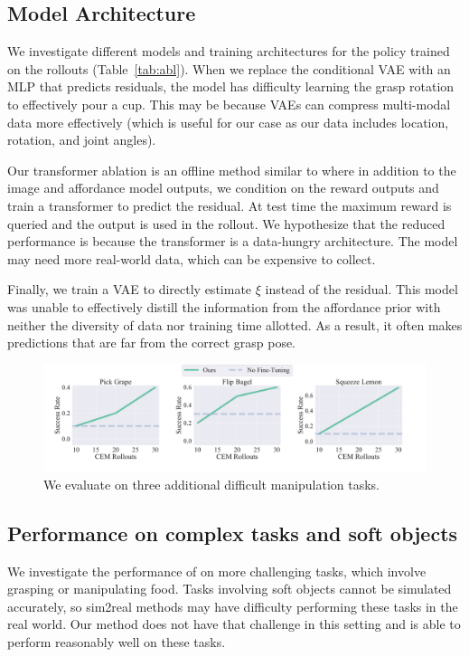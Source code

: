 \subsection{Model Architecture} We investigate different models and training architectures for the policy trained on the rollouts (Table~\ref{tab:abl}). When we replace the conditional VAE with an MLP that predicts residuals, the model has difficulty learning the grasp rotation to effectively pour a cup. This may be because VAEs can compress multi-modal data more effectively (which is useful for our case as our data includes location, rotation, and joint angles).

Our transformer ablation is an offline method similar to \cite{chen2021decisiontransformer} where in addition to the image and affordance model outputs, we condition on the reward outputs and train a transformer to predict the residual. At test time the maximum reward is queried and the output is used in the rollout. We hypothesize that the reduced performance is because the transformer is a data-hungry architecture. The model may need more real-world data, which can be expensive to collect.

Finally, we train a VAE to directly estimate $\xi$ instead of the residual. This model was unable to effectively distill the information from the affordance prior with neither the diversity of data nor training time allotted. As a result, it often makes predictions that are far from the correct grasp pose. 


\begin{figure}[t]
\vspace{-0.2in}
\begin{center}
    \includegraphics[width=\linewidth]{figs/graphs_difficult.pdf}
\end{center}
\vspace{-0.1in}
  \caption{\small We evaluate \ours on three additional difficult manipulation tasks. }
 \label{fig:graph_difficult}
 \vspace{-0.15in}
\end{figure}


\subsection{Performance on complex tasks and soft objects} 
We investigate the performance of \ours on more challenging tasks, which involve grasping or manipulating food. Tasks involving soft objects cannot be simulated accurately, so sim2real methods may have difficulty performing these tasks in the real world. Our method does not have that challenge in this setting and \ours is able to perform reasonably well on these tasks.

